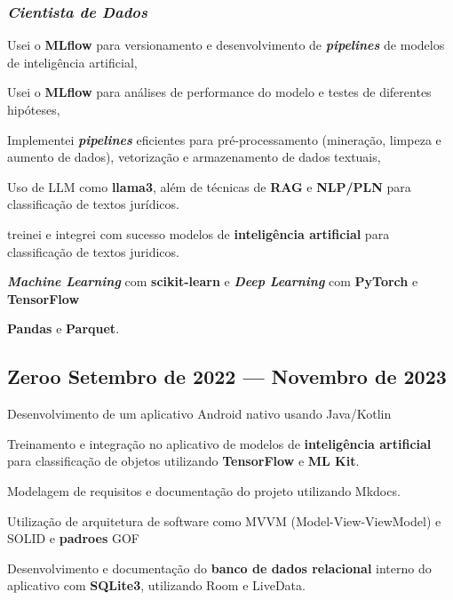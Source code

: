 \documentclass[a4paper,12pt]{article}
\begin{document}
\subsubsection*{\normalsize \textit{Cientista de Dados}}
\vspace{-1.3em}
\vspace{-0.5em}
\begin{zitemize}
    \item Usei o \textbf{MLflow} para versionamento e desenvolvimento de  \textbf{\textit{pipelines}} de modelos de inteligência artificial,
    \item Usei o \textbf{MLflow} para análises de performance do modelo e testes de diferentes hipóteses,
    \item Implementei \textbf{\textit{pipelines}} eficientes para pré-processamento (mineração, limpeza e aumento de dados), vetorização e armazenamento de dados textuais,
    \item Uso de LLM como \textbf{llama3}, além de técnicas de \textbf{RAG} e \textbf{NLP/PLN} para classificação de textos jurídicos.
    \item treinei e integrei com sucesso modelos de \textbf{inteligência artificial} para classificação de textos juridicos.
    \item \textbf{\textit{Machine Learning}} com \textbf{ scikit-learn} e \textbf{\textit{Deep Learning}} com \textbf{PyTorch} e  \textbf{TensorFlow}
    \item \textbf{Pandas} e \textbf{Parquet}.
\end{zitemize}

\vspace{1.5em}
\vspace*{7pt}
\vspace{1.5em}

\subsection*{\large Zeroo \hfill Setembro de 2022 --- Novembro de 2023}

\vspace{-0.5em}
\begin{zitemize}
    \item Desenvolvimento de um aplicativo Android nativo usando Java/Kotlin
    \item Treinamento e integração no aplicativo de modelos de \textbf{inteligência artificial} para classificação de objetos utilizando \textbf{TensorFlow} e \textbf{ML Kit}.  
    \item Modelagem de requisitos e documentação do projeto utilizando Mkdocs.
    \item Utilização de arquitetura de software como MVVM (Model-View-ViewModel) e SOLID e \textbf{padroes} GOF
    \item Desenvolvimento e documentação do \textbf{banco de dados relacional} interno do aplicativo com \textbf{SQLite3}, utilizando Room e LiveData.
\end{zitemize}
\end{document}
